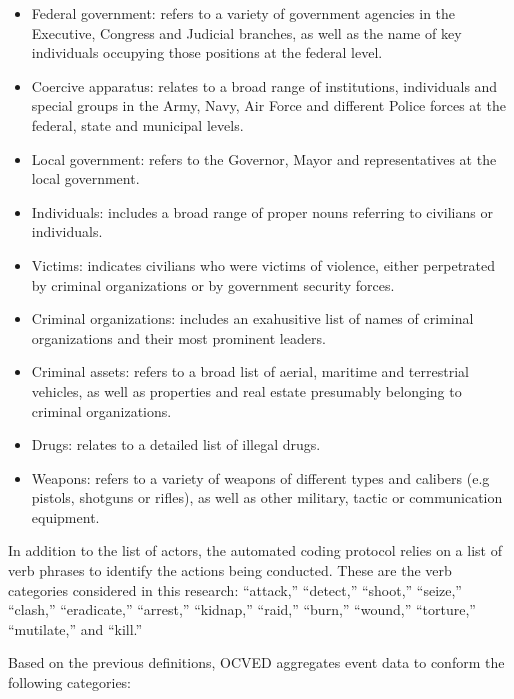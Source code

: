 \documentclass[12pt,letterpaper]{article}
\begin{document}
\begin{itemize} \itemsep-0.4em
    \item Federal government: refers to a variety of government agencies in the Executive, Congress and Judicial branches, as well as the name of key individuals occupying those positions at the federal level.     
    \item Coercive apparatus: relates to a broad range of institutions, individuals and special groups in the Army, Navy, Air Force and different Police forces at the federal, state and municipal levels. 
    \item Local government: refers to the Governor, Mayor and representatives at the local government.    
    \item Individuals: includes a broad range of proper nouns referring to civilians or individuals.
    \item Victims: indicates civilians who were victims of violence, either perpetrated by criminal organizations or by government security forces.                 
    \item Criminal organizations: includes an exahusitive list of names of criminal organizations and their most prominent leaders. 
    \item Criminal assets: refers to a broad list of aerial, maritime and terrestrial vehicles, as well as properties and real estate presumably belonging to criminal organizations.        
    \item Drugs: relates to a detailed list of illegal drugs.                  
    \item Weapons: refers to a variety of weapons of different types and calibers (e.g pistols, shotguns or rifles), as well as other military, tactic or communication equipment.                
\end{itemize}



In addition to the list of actors, the automated coding protocol relies on a list of verb phrases to identify the actions being conducted. These are the verb categories considered in this research: ``attack,'' ``detect,'' ``shoot,'' ``seize,'' ``clash,'' ``eradicate,'' ``arrest,'' ``kidnap,'' ``raid,'' ``burn,'' ``wound,'' ``torture,'' ``mutilate,'' and ``kill.'' 


Based on the previous definitions, OCVED aggregates event data to conform the following categories:
\end{document}
